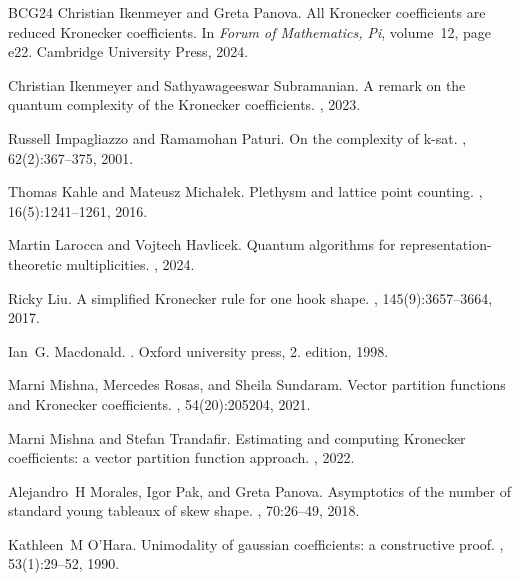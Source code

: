\documentclass[11pt]{amsart}
\theoremstyle{plain}
\theoremstyle{definition}
\numberwithin{equation}{section}
\begin{document}
\begin{thebibliography}{BCG{\etalchar{+}}24}
Christian Ikenmeyer and Greta Panova.
\newblock All {K}ronecker coefficients are reduced {K}ronecker coefficients.
\newblock In {\em Forum of Mathematics, Pi}, volume~12, page e22. Cambridge
  University Press, 2024.

Christian Ikenmeyer and Sathyawageeswar Subramanian.
\newblock A remark on the quantum complexity of the {K}ronecker coefficients.
, 2023.


Russell Impagliazzo and Ramamohan Paturi.
\newblock On the complexity of k-sat.
, 62(2):367--375, 2001.

Thomas Kahle and Mateusz Micha{\l}ek.
\newblock Plethysm and lattice point counting.
, 16(5):1241--1261,
  2016.

Martin Larocca and Vojtech Havlicek.
\newblock Quantum algorithms for representation-theoretic multiplicities.
, 2024.

Ricky Liu.
\newblock A simplified {K}ronecker rule for one hook shape.
,
  145(9):3657--3664, 2017.

Ian~G. Macdonald.
.
\newblock Oxford university press, 2. edition, 1998.


Marni Mishna, Mercedes Rosas, and Sheila Sundaram.
\newblock Vector partition functions and {K}ronecker coefficients.
,
  54(20):205204, 2021.

Marni Mishna and Stefan Trandafir.
\newblock Estimating and computing {K}ronecker coefficients: a vector partition
  function approach.
, 2022.


Alejandro~H Morales, Igor Pak, and Greta Panova.
\newblock Asymptotics of the number of standard young tableaux of skew shape.
, 70:26--49, 2018.

Kathleen~M O'Hara.
\newblock Unimodality of gaussian coefficients: a constructive proof.
, 53(1):29--52, 1990.


\end{thebibliography}
\end{document}
